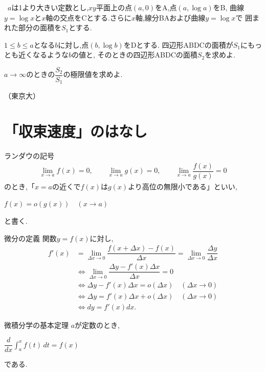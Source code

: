 \documentclass[10pt,fleqn,a4paper]{jsarticle}
\begin{document}
\noindent{}\
$a$は1より大きい定数とし,$xy$平面上の点$(a,0)$をA,点$(a,\log a)$をB,
曲線$y=\log x$と$x$軸の交点をCとする.さらに$x$軸,線分BAおよび曲線$y=\log x$で
囲まれた部分の面積を$S_1$とする.\
\par\noindent\kakkoichi $1\leq b\leq a$となる$b$に対し,点$(b,\log b)$をDとする.
四辺形ABDCの面積が$S_1$にもっとも近くなるような$b$の値と,
そのときの四辺形ABDCの面積$S_2$を求めよ.\
\par\noindent\kakkoni $a\to\infty$のときの$\dfrac{S_2}{S_1}$の極限値を求めよ.\
\par\noindent\hfill（東京大）\

\newpage

\section{「収束速度」のはなし}

\begin{itembox}
[l]{\enpitu ランダウの記号}
\begin{align*}
\lim_{x\to a}f(x)=0,\qquad
\lim_{x\to a}g(x)=0,\qquad
\lim_{x\to a}\dfrac{f(x)}{g(x)}=0
\end{align*}
のとき,「$x=a$の近くで$f(x)$は$g(x)$より高位の無限小である」といい,
\begin{center}
$f(x)=o(g(x))\quad(x\to a)$
\end{center}
と書く.
\end{itembox}

\begin{itembox}
[l]{\enpitu 微分の定義}
関数$y=f(x)$に対し,
\begin{align*}
f'(x)
&=\lim_{\Delta x\to0}\dfrac{f(x+\Delta x)-f(x)}{\Delta x}
=\lim_{\Delta x\to0}\dfrac{\Delta y}{\Delta x}\\
&\Longleftrightarrow \lim_{\Delta x\to0}\dfrac{\Delta y-f'(x)\Delta x}{\Delta x}=0\\
&\Longleftrightarrow \Delta y-f'(x)\Delta x=o(\Delta x)\quad(\Delta x\to0)\\
&\Longleftrightarrow \Delta y=f'(x)\Delta x+o(\Delta x)\quad(\Delta x\to0)\\
&\Longleftrightarrow dy=f'(x)dx.
\end{align*}
\end{itembox}

\begin{itembox}
[l]{\enpitu 微積分学の基本定理}
$a$が定数のとき,
\begin{center}
$\displaystyle\dfrac{d}{dx}\int_a^x f(t)\,dt=f(x)$
\end{center}
である.
\end{itembox}
\end{document}
